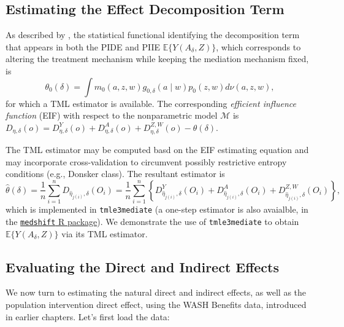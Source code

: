 \documentclass[12pt, krantz2,]{krantz}
\theoremstyle{definition}
\theoremstyle{definition}
\theoremstyle{definition}
\newcommand{\1}{\mathbbm{1}}
\begin{document}
\hypertarget{estimating-the-effect-decomposition-term}{%
\subsection{Estimating the Effect Decomposition Term}\label{estimating-the-effect-decomposition-term}}

As described by \citet{diaz2020causal}, the statistical functional identifying the
decomposition term that appears in both the PIDE and PIIE
\(\mathbb{E}\{Y(A_{\delta}, Z)\}\), which corresponds to altering the treatment
mechanism while keeping the mediation mechanism fixed, is
\begin{equation*}
  \theta_0(\delta) = \int m_0(a, z, w) g_{0,\delta}(a \mid w) p_0(z, w)
    d\nu(a, z, w),
\end{equation*}
for which a TML estimator is available. The corresponding \emph{efficient influence
function} (EIF) with respect to the nonparametric model \(\mathcal{M}\) is
\(D_{\eta,\delta}(o) = D^Y_{\eta,\delta}(o) + D^A_{\eta,\delta}(o) + D^{Z,W}_{\eta,\delta}(o) - \theta(\delta)\).

The TML estimator may be computed basd on the EIF estimating equation and may
incorporate cross-validation \citep{zheng2011cross, chernozhukov2018double} to
circumvent possibly restrictive entropy conditions (e.g., Donsker class). The
resultant estimator is
\begin{equation*}
  \hat{\theta}(\delta) = \frac{1}{n} \sum_{i = 1}^n D_{\hat{\eta}_{j(i)},
  \delta}(O_i) = \frac{1}{n} \sum_{i = 1}^n \left\{ D^Y_{\hat{\eta}_{j(i)},
  \delta}(O_i) + D^A_{\hat{\eta}_{j(i)}, \delta}(O_i) +
  D^{Z,W}_{\hat{\eta}_{j(i)}, \delta}(O_i) \right\},
\end{equation*}
which is implemented in \texttt{tmle3mediate} (a one-step estimator is also avaialble,
in the \href{https://github.com/nhejazi/medshift}{\texttt{medshift} R package}). We
demonstrate the use of \texttt{tmle3mediate} to obtain \(\mathbb{E}\{Y(A_{\delta}, Z)\}\)
via its TML estimator.

\hypertarget{evaluating-the-direct-and-indirect-effects}{%
\subsection{Evaluating the Direct and Indirect Effects}\label{evaluating-the-direct-and-indirect-effects}}

We now turn to estimating the natural direct and indirect effects, as well as
the population intervention direct effect, using the WASH Benefits data,
introduced in earlier chapters. Let's first load the data:
\end{document}
